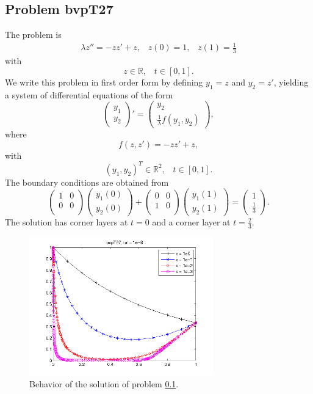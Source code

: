 \documentclass[<options>]{article}
\def \RR {{\mathbb{R}}}
\begin{document}
\subsection{Problem bvpT27}\label{test27}
The problem is 
\begin{eqnarray*}
\lambda z'' = - z z' +  z , \;\;\;z(0) =1, \;\;\; z(1) = \frac{1}{3}
\end{eqnarray*}
with
\[
z \in \RR, \;\;\; t\in [0,1].
\]
We write this problem in first order form by defining $y_1=z$ and $y_2=z'$, yielding a system of differential equations of the form
\begin{equation*}
\left(\begin{array}{c}
y_1\\
y_2
\end{array}\right)'=
\left(\begin{array}{c}
y_2\\
\frac{1}{\lambda}f(y_1,y_2)
\end{array}\right),
\end{equation*}
where
\begin{equation*}
f(z,z') = - z z' +  z,
\end{equation*}
with
\[
(y_1,y_2)^T \in \RR^{2}, \;\;\;  t \in [0,1].
\]
The  boundary conditions are obtained from
\begin{equation*}
\left(
  \begin{array}{cc}
    1 & 0 \\
    0 & 0 \\
  \end{array}
\right)
\left(\begin{array}{c}
y_{1}(0)\\
y_{2}(0)
\end{array}\right)
+
\left(
  \begin{array}{cc}
    0 & 0 \\
    1 & 0 \\
  \end{array}
\right)
\left(\begin{array}{c}
y_{1}(1)\\
y_{2}(1)
\end{array}\right)=\left(\begin{array}{c}
1 \\
\frac{1}{3}
\end{array}\right).
\end{equation*}
The solution has corner layers at $t= 0$ and a corner layer at $t= \frac{2}{3}.$

\begin{figure}[htb]
\centerline{\includegraphics[height=6cm]{Prob27}}
\caption{Behavior of the solution of problem \ref{test27}.}
\end{figure}
\newpage
\end{document}
